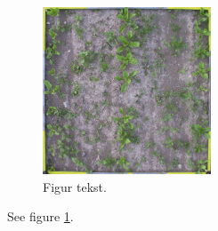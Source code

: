 \documentclass{article}
\begin{document}
\begin{figure}
\centering
\includegraphics[width=5cm]{img/image.jpg}
\caption{Figur tekst.}
\label{figPlanter}
\end{figure}

See figure \ref{figPlanter}.
\end{document}
